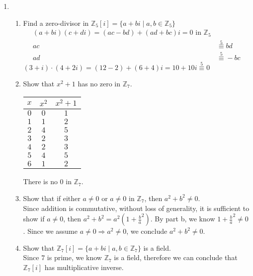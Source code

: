 \documentclass[12pt]{article}
\begin{document}
\begin{enumerate}
		\item
			\begin{enumerate}
				\item Find a zero-divisor in $\mathbb{Z}_5[i] = \{a + bi \mid a,b \in
					\mathbb{Z}_5\}$
					\begin{align*}
						(a + bi)(c + di) = (ac - bd) + (ad + bc)i = 0 \text{ in }
						\mathbb{Z}_5\\
						ac &\overset{5}{\equiv} bd\\
						ad &\overset{5}{\equiv} - bc
					\end{align*}
					$(3 + i)\cdot(4 + 2i) = (12 - 2) + (6 + 4)i = 10 + 10i
					\overset{5}{\equiv} 0$

				\item Show that $x^2 + 1$ has no zero in $\mathbb{Z}_7$. 
					\begin{center}
						\begin{tabular}{ c|c c }
							$x$ & $x^2$ & $x^2 + 1$ \\
							\hline
							$0$ & $0$   & $1$ \\
							$1$ & $1$   & $2$ \\
							$2$ & $4$   & $5$ \\
							$3$ & $2$   & $3$ \\
							$4$ & $2$   & $3$ \\
							$5$ & $4$   & $5$ \\
							$6$ & $1$   & $2$ \\
						\end{tabular}
					\end{center}
					There is no $0$ in $\mathbb{Z}_7$.

				\item Show that if either $a \neq 0$ or $a \neq 0$ in $\mathbb{Z}_7$,
					then $a^2 + b^2 \neq 0$.\\
					Since addition is commutative, without loss of generality, it is
					sufficient to show if $a \neq 0$, then $a^2+b^2 =
					a^2(1+\frac{b}{a}^2)$. By part b, we know $1+\frac{b}{a}^2 \neq 0$.
					Since we assume $a \neq 0 \Rightarrow a^2 \neq 0$, we conclude $a^2 +
					b^2 \neq 0$.

				\item Show that $\mathbb{Z}_7[i] = \{a + bi \mid a, b \in
					\mathbb{Z}_7\}$ is a field. \\
					Since $7$ is prime, we know $\mathbb{Z}_7$ is a field, therefore we
					can conclude that $\mathbb{Z}_7[i]$ has multiplicative inverse.

\end{enumerate}
\end{enumerate}
\end{document}

